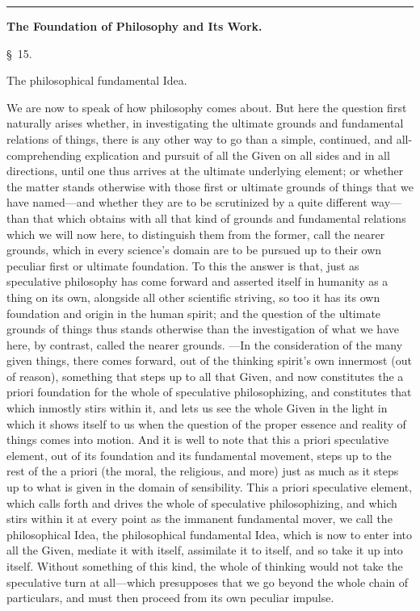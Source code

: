 \documentclass[12pt,a4paper]{book}
\newcommand{\grouphead}[1]{%
  \bigskip\begin{center}\large\textbf{#1}\end{center}\smallskip}
\begin{document}
\begin{center}\rule{0.18\linewidth}{0.4pt}\end{center}

\grouphead{The Foundation of Philosophy and Its Work.}

\begin{center}\large\S~15.\end{center}
\begin{center}The philosophical fundamental Idea.\end{center}

We are now to speak of how philosophy comes about. But here the question first
naturally arises whether, in investigating the ultimate grounds and fundamental
relations of things, there is any other way to go than a simple, continued, and
all-comprehending explication and pursuit of all the Given on all sides and in all
directions, until one thus arrives at the ultimate underlying element; or whether
the matter stands otherwise with those first or ultimate grounds of things that we
have named---and whether they are to be scrutinized by a quite different way---than
that which obtains with all that kind of grounds and fundamental relations which we
will now here, to distinguish them from the former, call the nearer grounds, which
in every science's domain are to be pursued up to their own peculiar first or
ultimate foundation. To this the answer is that, just as speculative philosophy has
come forward and asserted itself in humanity as a thing on its own, alongside all
other scientific striving, so too it has its own foundation and origin in the human
spirit; and the question of the ultimate grounds of things thus stands otherwise
than the investigation of what we have here, by contrast, called the nearer grounds.
---In the consideration of the many given things, there comes forward, out of the
thinking spirit's own innermost (out of reason), something that steps up to all that
Given, and now constitutes the a priori foundation for the whole of speculative
philosophizing, and constitutes that which inmostly stirs within it, and lets us
see the whole Given in the light in which it shows itself to us when the question of
the proper essence and reality of things comes into motion. And it is well to note
that this a priori speculative element, out of its foundation and its fundamental
movement, steps up to the rest of the a priori (the moral, the religious, and more)
just as much as it steps up to what is given in the domain of sensibility. This a
priori speculative element, which calls forth and drives the whole of speculative
philosophizing, and which stirs within it at every point as the immanent fundamental
mover, we call the philosophical Idea, the philosophical fundamental Idea, which is
now to enter into all the Given, mediate it with itself, assimilate it to itself,
and so take it up into itself. Without something of this kind, the whole of thinking
would not take the speculative turn at all---which presupposes that we go beyond the
whole chain of particulars, and must then proceed from its own peculiar impulse.
\end{document}
